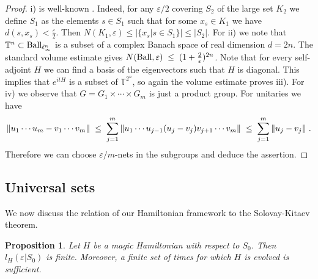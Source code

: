 \documentclass[12pt, a4-paper]{amsart}
\numberwithin{equation}{section}
\newcommand{\kl}{\pl \le \pl}
\newcommand{\pl}{\hspace{.1cm}}
\newcommand{\eps}{\varepsilon}
\newtheorem{prop}[lemma]{Proposition}
\begin{document}
\begin{proof} i) is well-known \cite{PSV,KSV}. Indeed, for any $\eps/2$ covering $S_2$ of the large set $K_2$ we define $S_1$ as the elements $s\in S_1$ such that for some $x_s\in K_1$ we have $d(s,x_s)<\frac{\eps}{2}$.  Then $N(K_1, \eps)\le |\{x_s|s\in S_1\}|\le |S_2|$. For ii) we note that $\mathbb{T}^n\subset {\rm Ball}_{\ell_{\infty}^n}$ is a subset of a complex Banach space of real dimension $d=2n$. The standard volume estimate \cite{PSV} gives $N({\rm Ball},\eps)\kl (1+\frac{2}{\eps})^{2n}$. Note that for every self-adjoint $H$ we can find a basis of the eigenvectors such that $H$ is diagonal. This implies that $e^{itH}$ is a subset of $\mathbb{T}^{2^n}$, so again the volume estimate proves iii).  For iv) we observe that $G=G_1\times \cdots \times G_m$ is just a product group. For unitaries we have 
  \[ \|u_1\cdots u_m-v_1\cdots v_m\|
  \kl \sum_{j=1}^m \|u_1\cdots u_{j-1}(u_j-v_j)v_{j+1}\cdots v_m\|
  \kl \sum_{j=1}^m \|u_j-v_j\| \pl. \]
Therefore we can choose $\eps/m$-nets  in the subgroups and deduce the assertion.   \end{proof} 

\subsection{Universal sets}\label{sub:univeral_sets}
We now discuss the relation of our Hamiltonian framework to the Solovay-Kitaev theorem. 

\begin{prop}\label{finite} Let $H$ be a magic Hamiltonian with respect to $S_0$. Then $l_H(\eps|S_0)$ is finite. Moreover, a finite set of times for which $H$ is evolved is sufficient.  \end{prop}
\end{document}
